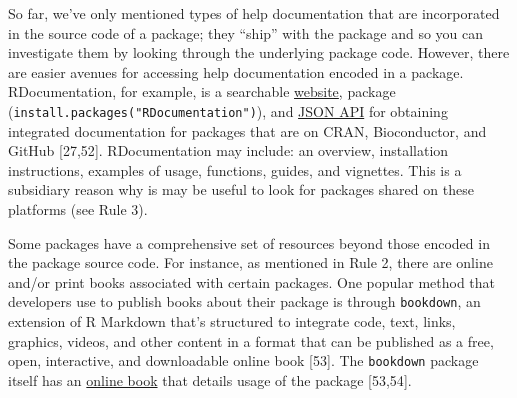 \documentclass[10pt,letterpaper]{article}
\begin{document}
So far, we've only mentioned types of help documentation that are
incorporated in the source code of a package; they ``ship'' with the
package and so you can investigate them by looking through the
underlying package code. However, there are easier avenues for accessing
help documentation encoded in a package. RDocumentation, for example, is
a searchable \href{https://www.rdocumentation.org/}{website}, package
(\texttt{install.packages("RDocumentation")}), and
\href{https://www.rdocumentation.org/docs/}{JSON API} for obtaining
integrated documentation for packages that are on CRAN, Bioconductor,
and GitHub {[}27,52{]}. RDocumentation may include: an overview,
installation instructions, examples of usage, functions, guides, and
vignettes. This is a subsidiary reason why is may be useful to look for
packages shared on these platforms (see Rule 3).

Some packages have a comprehensive set of resources beyond those encoded
in the package source code. For instance, as mentioned in Rule 2, there
are online and/or print books associated with certain packages. One
popular method that developers use to publish books about their package
is through \texttt{bookdown}, an extension of R Markdown that's
structured to integrate code, text, links, graphics, videos, and other
content in a format that can be published as a free, open, interactive,
and downloadable online book {[}53{]}. The \texttt{bookdown} package
itself has an \href{https://bookdown.org/yihui/bookdown/}{online book}
that details usage of the package {[}53,54{]}.
\end{document}
